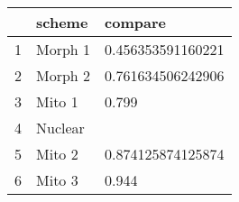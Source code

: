 \begin{table}[ht]
\centering
\begin{tabular}{rll}
  \hline
 & scheme & compare \\ 
  \hline
1 & Morph 1 & 0.456353591160221 \\ 
  2 & Morph 2 & 0.761634506242906 \\ 
  3 & Mito 1 & 0.799 \\ 
  4 & Nuclear &  \\ 
  5 & Mito 2 & 0.874125874125874 \\ 
  6 & Mito 3 & 0.944 \\ 
   \hline
\end{tabular}
\label{lldif}
\end{table}
